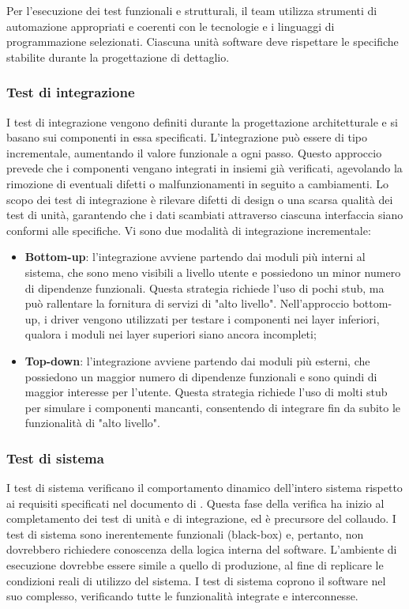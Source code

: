 \vspace{0.5\baselineskip}
\par Per l'esecuzione dei test funzionali e strutturali, il team utilizza strumenti di automazione appropriati e coerenti con le tecnologie e i linguaggi di programmazione selezionati. Ciascuna unità software deve rispettare le specifiche stabilite durante la progettazione di dettaglio.

\subsubsection{Test di integrazione}
\par I test di integrazione vengono definiti durante la progettazione architetturale e si basano sui componenti in essa specificati. L’integrazione può essere di tipo incrementale, aumentando il valore funzionale a ogni passo. Questo approccio prevede che i componenti vengano integrati in insiemi già verificati, agevolando la rimozione di eventuali difetti o malfunzionamenti in seguito a cambiamenti. Lo scopo dei test di integrazione è rilevare difetti di design o una scarsa qualità dei test di unità, garantendo che i dati scambiati attraverso ciascuna interfaccia siano conformi alle specifiche. Vi sono due modalità di integrazione incrementale:
\begin{itemize}
  \item \textbf{Bottom-up}: l’integrazione avviene partendo dai moduli più interni al sistema, che sono meno visibili a livello utente e possiedono un minor numero di dipendenze funzionali. Questa strategia richiede l’uso di pochi stub, ma può rallentare la fornitura di servizi di "alto livello". Nell’approccio bottom-up, i driver vengono utilizzati per testare i componenti nei layer inferiori, qualora i moduli nei layer superiori siano ancora incompleti;
  \item \textbf{Top-down}: l’integrazione avviene partendo dai moduli più esterni, che possiedono un maggior numero di dipendenze funzionali e sono quindi di maggior interesse per l’utente. Questa strategia richiede l'uso di molti stub per simulare i componenti mancanti, consentendo di integrare fin da subito le funzionalità di "alto livello".
\end{itemize}

\subsubsection{Test di sistema}
\par I test di sistema verificano il comportamento dinamico dell'intero sistema rispetto ai requisiti specificati nel documento di \AnalisiDeiRequisiti. Questa fase della verifica ha inizio al completamento dei test di unità e di integrazione, ed è precursore del collaudo. I test di sistema sono inerentemente funzionali (black-box) e, pertanto, non dovrebbero richiedere conoscenza della logica interna del software. L’ambiente di esecuzione dovrebbe essere simile a quello di produzione, al fine di replicare le condizioni reali di utilizzo del sistema. I test di sistema coprono il software nel suo complesso, verificando tutte le funzionalità integrate e interconnesse.


